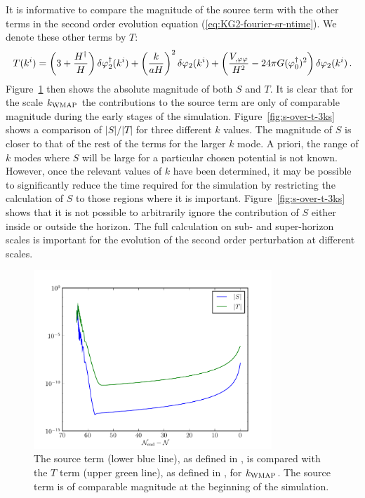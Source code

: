 %
It is informative to compare the magnitude of the source term with the
other terms in the second order evolution equation
(\ref{eq:KG2-fourier-sr-ntime}). We denote these other terms by $T$:
%
\begin{equation}
\label{eq:Tdefn}
 T(k^i) = \left(3 + \frac{H^{\dagger}}{H}\right)
\delta\varphi_{2}^{\dagger}(k^i)+ \left(\frac{k}{aH}\right)^2\delta\varphi_{2}(k^i)
+\left(\frac{V_{,\varphi\varphi}}{H^2}-{24 \pi G}(\varphi_{0}^{\dagger})^2\right)
\delta\varphi_{2}(k^i) \,.
\end{equation}
%
Figure~\ref{fig:src-vs-others} then shows the absolute magnitude of
both $S$ and $T$.  It is clear that for the scale $k_\mathrm{WMAP}$ the contributions to the
source term are only of comparable
magnitude during the early stages of the simulation.  
% 
Figure~\ref{fig:s-over-t-3ks}
shows a comparison of $|S|/|T|$ for three different $k$ values. 
The magnitude of $S$ is closer to that of the rest of the terms for the
larger $k$ mode.
A priori, the range of $k$ modes where $S$ will be large for a particular chosen
potential is not known. However, once the relevant values of $k$ have been
determined, it may be possible to significantly reduce the time
required for the simulation by restricting the calculation of $S$ to those regions
where it is important. Figure~\ref{fig:s-over-t-3ks} shows that it is not possible
to arbitrarily ignore the contribution of $S$ either inside or outside the horizon.
The full calculation on sub- and super-horizon scales is important for the evolution
of the second order perturbation at different scales.
%
\begin{figure}[htbp]
\centering
 \includegraphics[width=0.8\textwidth]{numerical/graphs/src-vs-t-kwmap-large}
\caption[Source Term Compared to $T$ Term]{The source term (lower blue line), as
defined in , is
compared with the $T$ term
(upper green line), as defined in , for $k_\mathrm{WMAP}$. The source term is of
comparable magnitude at the beginning of the simulation.}
 \label{fig:src-vs-others}
\end{figure}
% 


